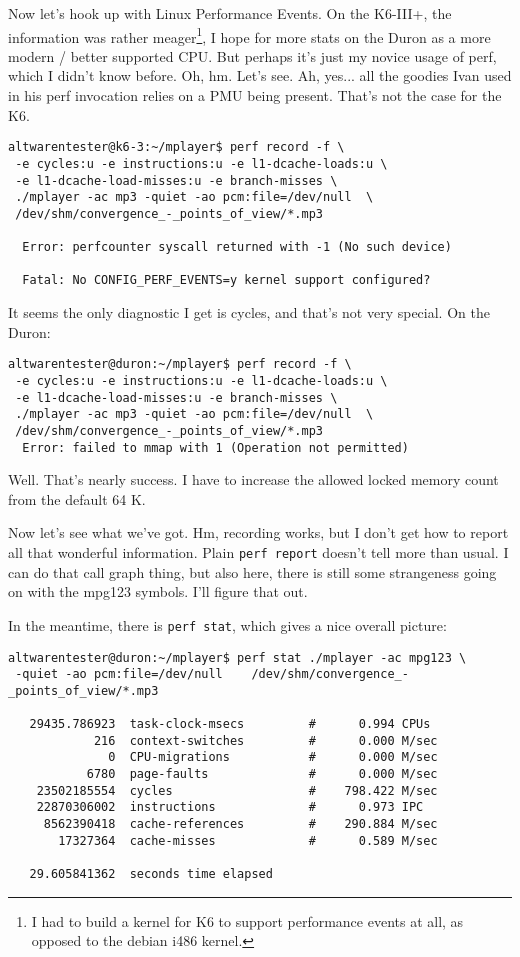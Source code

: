 \documentclass[a4paper,12pt]{scrartcl}
\begin{document}
Now let's hook up with Linux Performance Events. On the K6-III+, the information was rather meager\footnote{I had to build a kernel for K6 to support performance events at all, as opposed to the debian i486 kernel.}, I hope for more stats on the Duron as a more modern / better supported CPU.
But perhaps it's just my novice usage of perf, which I didn't know before. Oh, hm. Let's see. Ah, yes... all the goodies Ivan used in his perf invocation relies on a PMU being present. That's not the case for the K6.
\begin{verbatim}
altwarentester@k6-3:~/mplayer$ perf record -f \
 -e cycles:u -e instructions:u -e l1-dcache-loads:u \
 -e l1-dcache-load-misses:u -e branch-misses \
 ./mplayer -ac mp3 -quiet -ao pcm:file=/dev/null  \
 /dev/shm/convergence_-_points_of_view/*.mp3

  Error: perfcounter syscall returned with -1 (No such device)

  Fatal: No CONFIG_PERF_EVENTS=y kernel support configured?
\end{verbatim}
It seems the only diagnostic I get is cycles, and that's not very special. On the Duron:
\begin{verbatim}
altwarentester@duron:~/mplayer$ perf record -f \
 -e cycles:u -e instructions:u -e l1-dcache-loads:u \
 -e l1-dcache-load-misses:u -e branch-misses \
 ./mplayer -ac mp3 -quiet -ao pcm:file=/dev/null  \
 /dev/shm/convergence_-_points_of_view/*.mp3
  Error: failed to mmap with 1 (Operation not permitted)
\end{verbatim}
Well. That's nearly success. I have to increase the allowed locked memory count from the default 64 K.

Now let's see what we've got. Hm, recording works, but I don't get how to report all that wonderful information.
Plain \verb:perf report: doesn't tell more than usual. I can do that call graph thing, but also here, there is still some strangeness going on with the mpg123 symbols. I'll figure that out.

In the meantime, there is \verb:perf stat:, which gives a nice overall picture:

\begin{verbatim}
altwarentester@duron:~/mplayer$ perf stat ./mplayer -ac mpg123 \
 -quiet -ao pcm:file=/dev/null    /dev/shm/convergence_-_points_of_view/*.mp3

   29435.786923  task-clock-msecs         #      0.994 CPUs 
            216  context-switches         #      0.000 M/sec
              0  CPU-migrations           #      0.000 M/sec
           6780  page-faults              #      0.000 M/sec
    23502185554  cycles                   #    798.422 M/sec
    22870306002  instructions             #      0.973 IPC  
     8562390418  cache-references         #    290.884 M/sec
       17327364  cache-misses             #      0.589 M/sec

   29.605841362  seconds time elapsed
\end{verbatim}
\end{document}

